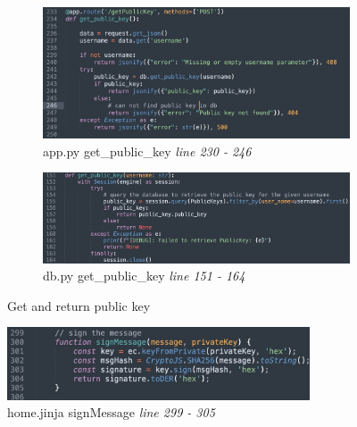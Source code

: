 \documentclass[12pt]{article}
\begin{document}
\begin{enumerate}
            \begin{figure}[H]
                \centering
                \begin{subfigure}[b]{0.47\textwidth}
                    \centering
                    \includegraphics[width=\textwidth]{graphs/back_get_public_key.jpg}
                    \caption{app.py get\_public\_key \textit{line 230 - 246}}
                \end{subfigure}
                \hfill 
                \begin{subfigure}[b]{0.47\textwidth}
                    \centering
                    \includegraphics[width=\textwidth]{graphs/db_get_public_key.jpg}
                    \caption{db.py get\_public\_key \textit{line 151 - 164}}
                \end{subfigure}
                \caption{Get and return public key}
                \label{get and return public key}
            \end{figure}

            \begin{figure}[H]
                \centering
                \includegraphics[width=0.8\textwidth]{graphs/sign_message.jpg}
                \caption{home.jinja signMessage \textit{line 299 - 305}}
                \label{sign message}
            \end{figure}


\end{enumerate}
\end{document}
